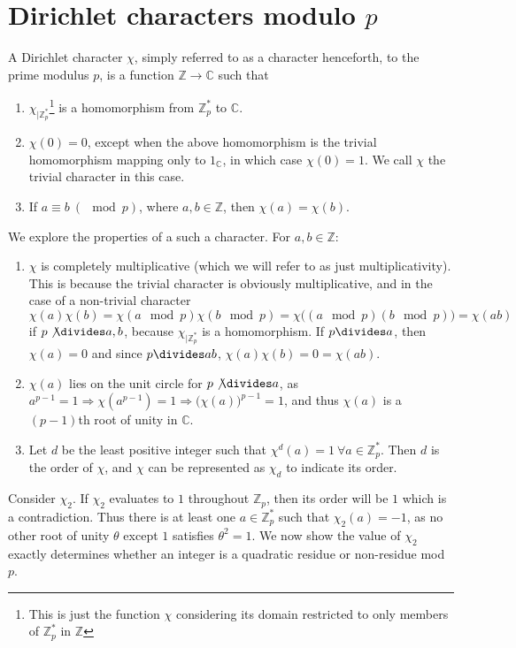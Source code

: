 \documentclass{report}
\begin{document}
\section{Dirichlet characters modulo $p$}
%
A Dirichlet character $\chi$, simply referred to as a character henceforth, to the prime modulus $p$, is a function $\mathbb{Z} \rightarrow \mathbb{C}$ such that
\begin{enumerate}
    \item $\chi_{|\mathbb{Z}^*_p}$\footnote{This is just the function $\chi$ considering its domain restricted to only members of $\mathbb{Z}^*_p$ in $\mathbb{Z}$} is a homomorphism from $\mathbb{Z}^*_p$ to $\mathbb{C}$.
    \item $\chi(0)=0$, except when the above homomorphism is the trivial homomorphism mapping only to $1_{\mathbb {C}}$, in which case $\chi(0)=1$. We call $\chi$ the trivial character in this case.
    \item If $a \equiv b\  (\!\mod p)$, where $a,b\in\mathbb{Z}$, then $\chi(a)=\chi(b)$.
\end{enumerate}
We explore the properties of a such a character. For $a,b \in \mathbb{Z}$:
\begin{enumerate}
    \item $\chi$ is completely multiplicative (which we will refer to as just multiplicativity). This is because the trivial character is obviously multiplicative, and in the case of a non-trivial character $\chi(a)\chi(b)=\chi(a \mod p)\chi(b \mod p)= \chi\big((a \mod p)(b \mod p)\big)=\chi(ab)$ if $p\not\divides a,b$, because $\chi_{|\mathbb{Z}^*_p}$ is a homomorphism. If $p\divides a$, then $\chi(a)=0$ and since $p\divides ab$, $\chi(a)\chi(b)=0=\chi(ab)$.
    \item $\chi(a)$ lies on the unit circle for $p\not\divides a$, as $a^{p-1}=1 \Rightarrow \chi(a^{p-1})=1 \Rightarrow \big( \chi(a) \big)^{p-1} = 1$, and thus $\chi(a)$ is a $(p-1)$th root of unity in $\mathbb{C}$.
    \item Let $d$ be the least positive integer such that $\chi^d(a)=1 \ \forall a\in \mathbb{Z}^*_p$. Then $d$ is the order of $\chi$, and $\chi$ can be represented as $\chi_d$ to indicate its order.
\end{enumerate}

Consider $\chi_2$. If $\chi_2$ evaluates to $1$ throughout $\mathbb{Z}_p$, then its order will be $1$ which is a contradiction. Thus there is at least one $a\in\mathbb{Z}^*_p$ such that $\chi_2(a)=-1$, as no other root of unity $\theta$ except $1$ satisfies $\theta^2=1$. We now show the value of $\chi_2$ exactly determines whether an integer is a quadratic residue or non-residue mod $p$.
\end{document}
